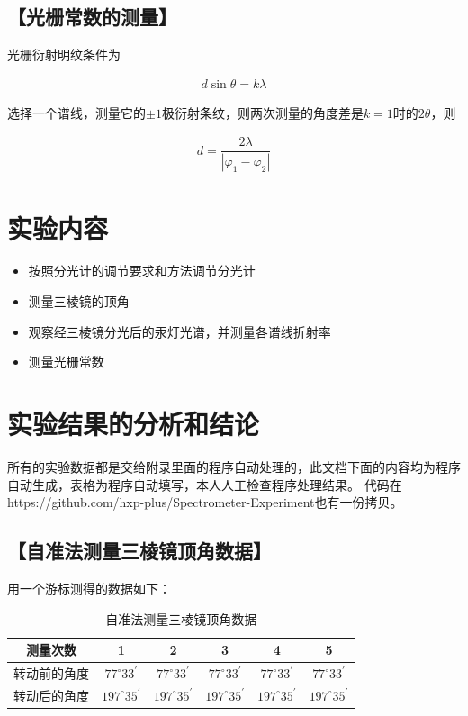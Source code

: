 \documentclass{ctexart}
\let\oldsubsection\subsection
\renewcommand{\subsection}[1]{\oldsubsection{\!\!\!\!\!\!【#1】}}
\begin{document}
\subsection{光栅常数的测量}

光栅衍射明纹条件为

\begin{equation*}
  \begin{aligned}
    d \sin \theta = k \lambda
  \end{aligned}
\end{equation*}

选择一个谱线，测量它的$\pm 1$极衍射条纹，则两次测量的角度差是$k=1$时的$2\theta$，则

\begin{equation*}
  \begin{aligned}
    d= \dfrac{2 \lambda}{\left| \varphi_1 - \varphi_2 \right|} 
  \end{aligned}
\end{equation*}

\section{实验内容}

\begin{itemize}
\item 按照分光计的调节要求和方法调节分光计
\item 测量三棱镜的顶角
\item 观察经三棱镜分光后的汞灯光谱，并测量各谱线折射率
\item 测量光栅常数
\end{itemize}

\section{实验结果的分析和结论}

所有的实验数据都是交给附录里面的程序自动处理的，此文档下面的内容均为程序自动生成，表格为程序自动填写，本人人工检查程序处理结果。
代码在https://github.com/hxp-plus/Spectrometer-Experiment也有一份拷贝。

\subsection{自准法测量三棱镜顶角数据}

用一个游标测得的数据如下：

\begin{table}[H]
  \centering
  \begin{tabular}{|c|c|c|c|c|c|}
    \hline
     测量次数           & 1 & 2 & 3 & 4 & 5 
     \\\hline
     转动前的角度 &$77^\circ 33^\prime$&$77^\circ 33^\prime$&$77^\circ 33^\prime$&$77^\circ 33^\prime$&$77^\circ 33^\prime$\\\hline
     转动后的角度 &$197^\circ 35^\prime$&$197^\circ 35^\prime$&$197^\circ 35^\prime$&$197^\circ 35^\prime$&$197^\circ 35^\prime$\\\hline
  \end{tabular}
  \caption{自准法测量三棱镜顶角数据}
\end{table}
\end{document}
